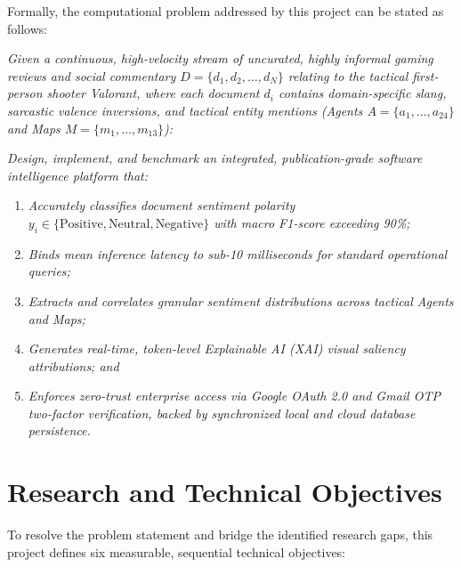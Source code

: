Formally, the computational problem addressed by this project can be stated as follows:

\vspace{0.3cm}
\begin{tcolorbox}[colback=red!3!white,colframe=krmured,arc=2mm,title=\textbf{Formal Problem Statement}]
\textit{Given a continuous, high-velocity stream of uncurated, highly informal gaming reviews and social commentary $D = \{d_1, d_2, \dots, d_N\}$ relating to the tactical first-person shooter \textit{Valorant}, where each document $d_i$ contains domain-specific slang, sarcastic valence inversions, and tactical entity mentions (Agents $A = \{a_1, \dots, a_{24}\}$ and Maps $M = \{m_1, \dots, m_{13}\}$):}

\vspace{0.2cm}
\textit{Design, implement, and benchmark an integrated, publication-grade software intelligence platform that:}
\begin{enumerate}
    \item \textit{Accurately classifies document sentiment polarity $y_i \in \{\text{Positive}, \text{Neutral}, \text{Negative}\}$ with macro F1-score exceeding 90\%;}
    \item \textit{Binds mean inference latency to sub-10 milliseconds for standard operational queries;}
    \item \textit{Extracts and correlates granular sentiment distributions across tactical Agents and Maps;}
    \item \textit{Generates real-time, token-level Explainable AI (XAI) visual saliency attributions; and}
    \item \textit{Enforces zero-trust enterprise access via Google OAuth 2.0 and Gmail OTP two-factor verification, backed by synchronized local and cloud database persistence.}
\end{enumerate}
\end{tcolorbox}

\section{Research and Technical Objectives}
\label{sec:objectives}

To resolve the problem statement and bridge the identified research gaps, this project defines six measurable, sequential technical objectives:

